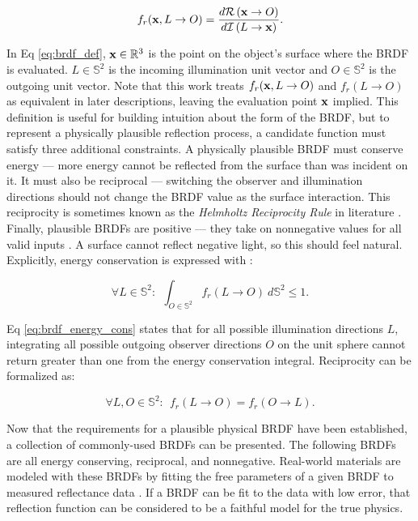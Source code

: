 \begin{equation} \label{eq:brdf_def}
    f_r(\mathbf{x}, L \rightarrow O) = \frac{d\mathcal{R}\left(\mathbf{x} \rightarrow O\right)}{d\mathcal{I}\left(L \rightarrow \mathbf{x}\right)}.
\end{equation}

In Eq \ref{eq:brdf_def}, $\mathbf{x} \in \mathbb{R}^3$ is the point on the object's surface where the BRDF is evaluated. $L \in \mathbb{S}^2$ is the incoming illumination unit vector and $O \in \mathbb{S}^2$ is the outgoing unit vector. Note that this work treats $f_r(\mathbf{x}, L \rightarrow O)$ and $f_r(L \rightarrow O)$ as equivalent in later descriptions, leaving the evaluation point $\mathbf{x}$ implied. This definition is useful for building intuition about the form of the BRDF, but to represent a physically plausible reflection process, a candidate function must satisfy three additional constraints. A physically plausible BRDF must conserve energy --- more energy cannot be reflected from the surface than was incident on it. It must also be reciprocal --- switching the observer and illumination directions should not change the BRDF value as the surface interaction. This reciprocity is sometimes known as the \textit{Helmholtz Reciprocity Rule} in literature \cite{montes2012}. Finally, plausible BRDFs are positive --- they take on nonnegative values for all valid inputs \cite{montes2012}. A surface cannot reflect negative light, so this should feel natural. Explicitly, energy conservation is expressed with \cite{montes2012}:

\begin{equation} \label{eq:brdf_energy_cons}
  \forall L \in \mathbb{S}^2 : \:\: \int_{O \in \mathbb{S}^2} f_r(L \rightarrow O) \: d\mathbb{S}^2 \leq 1.
\end{equation}

Eq \ref{eq:brdf_energy_cons} states that for all possible illumination directions $L$, integrating all possible outgoing observer directions $O$ on the unit sphere cannot return greater than one from the energy conservation integral. Reciprocity can be formalized as:

\begin{equation} \label{eq:brdf_reciprocity}
  \forall L, O \in \mathbb{S}^2 : \:\: f_r(L \rightarrow O) = f_r(O \rightarrow L).
\end{equation}

Now that the requirements for a plausible physical BRDF have been established, a collection of commonly-used BRDFs can be presented. The following BRDFs are all energy conserving, reciprocal, and nonnegative. Real-world materials are modeled with these BRDFs by fitting the free parameters of a given BRDF to measured reflectance data \cite{matusik2003}. If a BRDF can be fit to the data with low error, that reflection function can be considered to be a faithful model for the true physics. 

